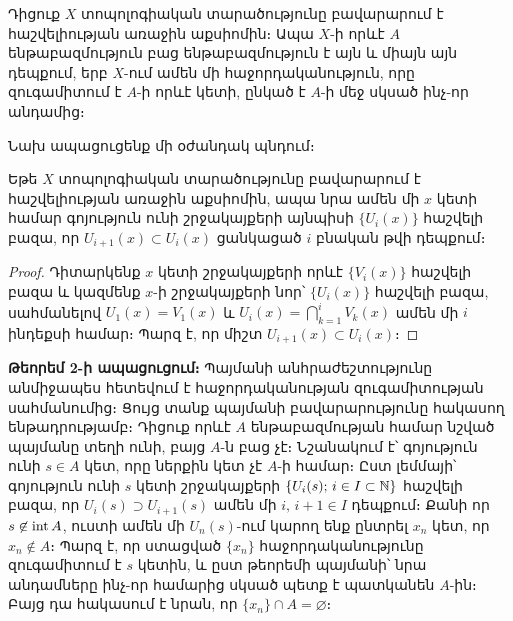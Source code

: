 \documentclass[./main.tex]{subfiles}
\begin{document}
\begin{theorem}\label{ch10thm2}
Դիցուք $X$ տոպոլոգիական տարածությունը բավարարում է հաշվե\-լի\-ու\-թյան առաջին աքսիոմին։ Ապա $X$-ի որևէ $A$ ենթաբազ\-մու\-թյուն բաց ենթա\-բազ\-մու\-թյուն է այն և միայն այն դեպքում, երբ $X$-ում ամեն մի հաջորդականություն, որը զուգամիտում է $A$-ի որևէ կետի, ընկած է $A$-ի մեջ սկսած ինչ-որ անդամից։
\end{theorem}
\label{thm:9.2}
\par Նախ ապացուցենք մի օժանդակ պնդում։
\begin{lemma}\label{ch10lem1}
Եթե $X$ տոպոլոգիական տարածությունը բավարարում է հաշվելիության առաջին աքսիո\-մին, ապա նրա ամեն մի $x$ կետի համար գոյություն ունի շրջակայ\-քե\-րի այնպիսի $\{ U_i(x)\}$ հաշվելի բազա, որ $U_{i+1}(x)\subset U_i(x)$ ցանկացած $i$ բնական թվի դեպքում։
\end{lemma}
\begin{proof}
Դիտարկենք $x$ կետի շրջակայքերի որևէ $\{ V_i(x)\}$ հաշ\-վե\-լի բազա և կազմենք $x$-ի շրջակայքերի նոր՝ $\{ U_i(x)\}$ հաշ\-վե\-լի բազա, սահմանելով $U_1(x)=V_1(x)$ և $U_i(x)=\bigcap\limits_{k=1}^i V_k(x)$ ամեն մի $i$ ինդեքսի համար։ Պարզ է, որ միշտ $U_{i+1}(x)\subset U_i(x)$։ %
\end{proof}
\begin{varproof}
\par \textbf{Թեորեմ 2-ի ապացուցում։} Պայմանի անհրաժեշտությունը անմիջապես հե\-տե\-վում է հաջորդա\-կա\-նու\-թյան զուգամիտության սահմանումից։ Ցույց տանք պայմանի բա\-վարարութ\-յունը հակասող ենթադրությամբ։ Դիցուք որևէ $A$ ենթաբազմության համար նշված պայմանը տեղի ունի, բայց $A$-ն բաց չէ։ Նշանակում է՝ գոյություն ունի $s\in A$ կետ, որը ներքին կետ չէ $A$-ի համար։ Ըստ լեմմայի՝ գոյություն ունի $s$ կետի շրջակայքերի $\{ U_i(s);\, i\in I \subset \mathbb{N}\}$ հաշվելի բազա, որ $U_i(s)\supset U_{i+1}(s)$ ամեն մի $i,\, i+1\in I$ դեպքում։ Քանի որ $s \not\in \operatorname{int} A$, ուստի ամեն մի $U_n(s)$-ում կարող ենք ընտրել $x_n$ կետ, որ $x_n\not\in A$։ Պարզ է, որ ստացված $\{x_n\}$ հաջորդականությունը զուգամիտում է $s$ կետին, և ըստ թեորեմի պայմանի՝ նրա անդամները ինչ-որ համարից սկսած պետք է պատկանեն $A$-ին։ Բայց դա հակասում է նրան, որ $\{x_n\}\cap A=\varnothing$։
\end{varproof}
\end{document}
